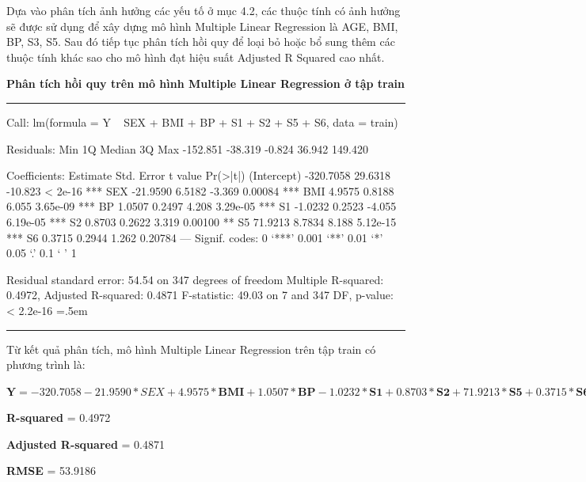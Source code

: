 \documentclass[runningheads]{llncs}
\newenvironment{lcverbatim}
 {\SaveVerbatim{cverb}}
 {\endSaveVerbatim
  \flushleft\fboxrule=0pt\fboxsep=.5em
  \colorbox{cverbbg}{%
    \makebox[\dimexpr\linewidth-2\fboxsep][l]{\BUseVerbatim{cverb}}%
  }
  \endflushleft
}
\begin{document}
Dựa vào phân tích ảnh hưởng các yếu tố ở mục 4.2, các thuộc tính có ảnh hưởng sẽ được sử dụng để xây dựng mô hình Multiple Linear Regression là AGE, BMI, BP, S3, S5. Sau đó tiếp tục phân tích hồi quy để loại bỏ hoặc bổ sung thêm các thuộc tính khác sao cho mô hình đạt hiệu suất Adjusted R Squared cao nhất.

\vspace{0.5cm}
\textbf{Phân tích hồi quy trên mô hình Multiple Linear Regression ở tập train}
\vspace{0.5cm}
\hrule
\begin{lcverbatim}
Call:
lm(formula = Y ~ SEX + BMI + BP + S1 + S2 + S5 + S6, data = train)

Residuals:
     Min       1Q   Median       3Q      Max 
-152.851  -38.319   -0.824   36.942  149.420 

Coefficients:
             Estimate Std. Error t value Pr(>|t|)    
(Intercept) -320.7058    29.6318 -10.823  < 2e-16 ***
SEX          -21.9590     6.5182  -3.369  0.00084 ***
BMI            4.9575     0.8188   6.055 3.65e-09 ***
BP             1.0507     0.2497   4.208 3.29e-05 ***
S1            -1.0232     0.2523  -4.055 6.19e-05 ***
S2             0.8703     0.2622   3.319  0.00100 ** 
S5            71.9213     8.7834   8.188 5.12e-15 ***
S6             0.3715     0.2944   1.262  0.20784    
---
Signif. codes:  0 ‘***’ 0.001 ‘**’ 0.01 ‘*’ 0.05 ‘.’ 0.1 ‘ ’ 1

Residual standard error: 54.54 on 347 degrees of freedom
Multiple R-squared:  0.4972,	Adjusted R-squared:  0.4871 
F-statistic: 49.03 on 7 and 347 DF,  p-value: < 2.2e-16
\end{lcverbatim}
\hrule
\vspace{0.5cm}

Từ kết quả phân tích, mô hình Multiple Linear Regression trên tập train có phương trình là:
\begin{center}
	$\textbf{Y}=  -320.7058 -21.9590* SEX + 4.9575*\textbf{BMI} +  1.0507*\textbf{BP} -
	1.0232*\textbf{S1} + 0.8703*\textbf{S2} + 71.9213*\textbf{S5} + 0.3715*\textbf{S6} $
\end{center}

\textbf{R-squared} = 0.4972

\textbf{Adjusted R-squared} = 0.4871

\textbf{RMSE} = 53.9186
\end{document}
